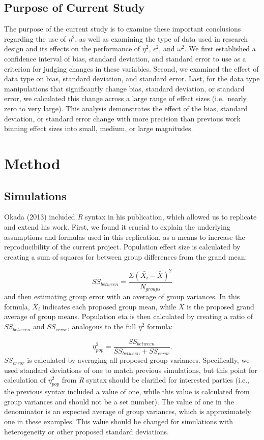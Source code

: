 \documentclass[english,man]{apa6}
\theoremstyle{definition}
\theoremstyle{definition}
\theoremstyle{definition}
\theoremstyle{remark}
\begin{document}
\subsection{Purpose of Current Study}\label{purpose-of-current-study}

The purpose of the current study is to examine these important
conclusions regarding the use of \(\eta^2\), as well as examining the
type of data used in research design and its effects on the performance
of \(\eta^2\), \(\epsilon^2\), and \(\omega^2\). We first established a
confidence interval of bias, standard deviation, and standard error to
use as a criterion for judging changes in these variables. Second, we
examined the effect of data type on bias, standard deviation, and
standard error. Last, for the data type manipulations that significantly
change bias, standard deviation, or standard error, we calculated this
change across a large range of effect sizes (i.e.~nearly zero to very
large). This analysis demonstrates the effect of the bias, standard
deviation, or standard error change with more precision than previous
work binning effect sizes into small, medium, or large magnitudes.

\section{Method}\label{method}

\subsection{Simulations}\label{simulations}

Okada (2013) included \emph{R} syntax in his publication, which allowed
us to replicate and extend his work. First, we found it crucial to
explain the underlying assumptions and formulas used in this
replication, as a means to increase the reproducibility of the current
project. Population effect size is calculated by creating a sum of
squares for between group differences from the grand mean:

\[
SS_{between} = \frac{\Sigma (\bar{X_{i}} - \bar{X})^2} {N_{groups}}
\] and then estimating group error with an average of group variances.
In this formula, \(\bar{X_{i}}\) indicates each proposed group mean,
while \(\bar{X}\) is the proposed grand average of group means.
Population eta is then calculated by creating a ratio of
\(SS_{between}\) and \(SS_{error}\), analogous to the full \(\eta^2\)
formula:

\[
\eta^2_{pop} = \frac{SS_{between}} {SS_{between} + SS_{error}}.
\] \(SS_{error}\) is calculated by averaging all proposed group
variances. Specifically, we used standard deviations of one to match
previous simulations, but this point for calculation of \(\eta^2_{pop}\)
from \emph{R} syntax should be clarified for interested parties (i.e.,
the previous syntax included a value of one, while this value is
calculated from group variances and should not be a set number). The
value of one in the denominator is an expected average of group
variances, which is approximately one in these examples. This value
should be changed for simulations with heterogeneity or other proposed
standard deviations.
\end{document}

